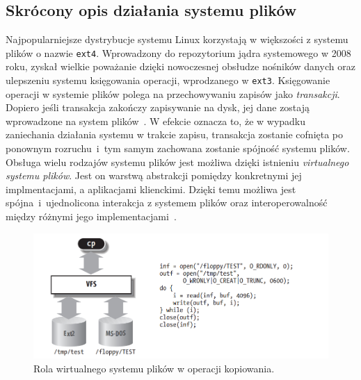 \subsection{Skrócony opis działania systemu plików}
Najpopularniejsze dystrybucje systemu Linux korzystają w większości z systemu plików o nazwie \texttt{ext4}.
Wprowadzony do repozytorium jądra systemowego w 2008 roku, zyskał wielkie poważanie dzięki nowoczesnej obsłudze nośników 
danych oraz ulepszeniu systemu księgowania operacji, wprodzanego w \texttt{ext3}. Księgowanie operacji w systemie plików
polega na przechowywaniu zapisów jako \emph{transakcji}. Dopiero jeśli transakcja zakończy zapisywanie na dysk, jej dane 
zostają wprowadzone na system plików~\cite{ext4}. W efekcie oznacza to, że w wypadku zaniechania działania
systemu w trakcie zapisu, transakcja zostanie cofnięta po ponownym rozruchu~i~tym samym zachowana zostanie spójność systemu plików.
\newline
Obsługa wielu rodzajów systemu plików jest możliwa dzięki istnieniu \emph{virtualnego systemu plików}. 
Jest on warstwą abstrakcji pomiędzy konkretnymi jej implmentacjami, a aplikacjami klienckimi.
Dzięki temu możliwa jest spójna~i~ujednolicona interakcja z systemem plików oraz interoperowalność między różnymi jego implementacjami~\cite{kernel}.
\begin{figure}[H]
    \centering
    \includegraphics[width=0.9\linewidth]{rysunki/vfs.png}
    \caption{Rola wirtualnego systemu plików w operacji kopiowania\protect \footnotemark.} 
    \label{fig:enter-label}
\end{figure}

